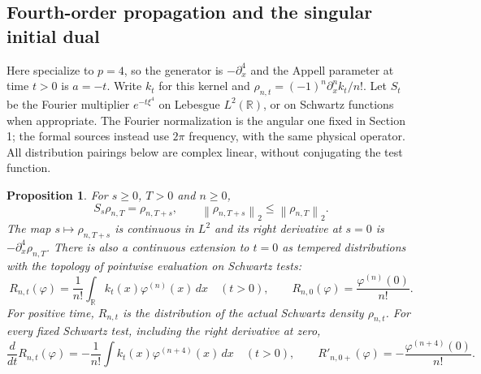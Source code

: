 \documentclass[11pt]{article}
\newtheorem{proposition}[theorem]{Proposition}
\theoremstyle{remark}\newtheorem{remark}[theorem]{Remark}
\newcommand{\R}{\mathbb R}\newcommand{\N}{\mathbb N}
\newcommand{\norm}[1]{\left\lVert#1\right\rVert}
\begin{document}
\subsection*{Fourth-order propagation and the singular initial dual}
Here specialize to $p=4$, so the generator is $-\partial_x^4$
and the Appell parameter at time $t>0$ is $a=-t$.
Write $k_t$ for this kernel and
$\rho_{n,t}=(-1)^n\partial_x^n k_t/n!$.
Let $S_t$ be the Fourier multiplier $e^{-t\xi^4}$ on
Lebesgue $L^2(\R)$, or on Schwartz functions when appropriate.
The Fourier normalization is the angular one fixed in Section 1;
the formal sources instead use $2\pi$ frequency, with the same
physical operator. All distribution pairings below are complex
linear, without conjugating the test function.

\begin{proposition}\label{prop:dualpropagation}
For $s\geq0$, $T>0$ and $n\geq0$,
\[
 S_s\rho_{n,T}=\rho_{n,T+s},\qquad
 \norm{\rho_{n,T+s}}_2\leq\norm{\rho_{n,T}}_2.
\]
The map $s\mapsto\rho_{n,T+s}$ is continuous in $L^2$ and
its right derivative at $s=0$ is $-\partial_x^4\rho_{n,T}$.
There is also a continuous extension to $t=0$ as tempered
distributions with the topology of pointwise evaluation on
Schwartz tests:
\begin{equation}\label{eq:dualinitial}
 R_{n,t}(\varphi)=\frac1{n!}\int_\R k_t(x)\varphi^{(n)}(x)\,dx
 \quad(t>0),\qquad
 R_{n,0}(\varphi)=\frac{\varphi^{(n)}(0)}{n!}.
\end{equation}
For positive time, $R_{n,t}$ is the distribution of the actual
Schwartz density $\rho_{n,t}$. For every fixed Schwartz test,
including the right derivative at zero,
\begin{equation}\label{eq:dualgenerator}
 \frac{d}{dt}R_{n,t}(\varphi)
   =-\frac1{n!}\int k_t(x)\varphi^{(n+4)}(x)\,dx
 \quad(t>0),\qquad
 R'_{n,0+}(\varphi)=-\frac{\varphi^{(n+4)}(0)}{n!}.
\end{equation}
\end{proposition}
\end{document}
